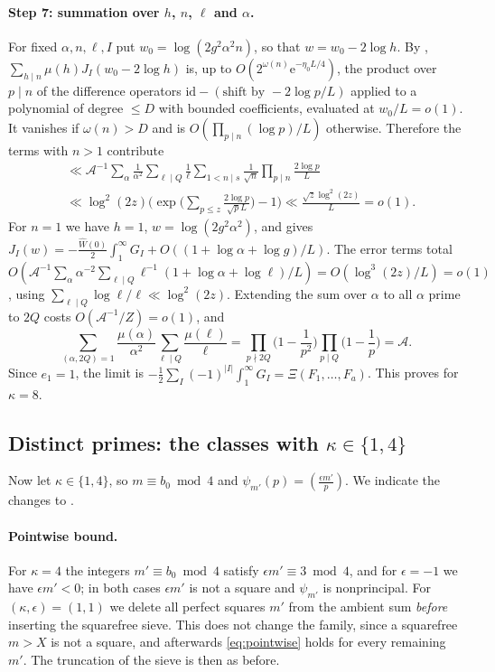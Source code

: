 \documentclass[11pt,colorlinks]{charlie}
\newcommand{\cA}{\mathcal{A}}
\newcommand{\e}{\mathrm{e}}
\begin{document}
\paragraph{Step 7: summation over $h$, $n$, $\ell$ and $\alpha$.}
For fixed $\alpha,n,\ell,I$ put $w_0=\log(2g^2\alpha^2n)$, so that $w=w_0-2\log h$. By , $\sum_{h\mid n}\mu(h)J_I(w_0-2\log h)$ is, up to $O(2^{\omega(n)}\e^{-\eta_0L/4})$, the product over $p\mid n$ of the difference operators $\mathrm{id}-(\text{shift by }-2\log p/L)$ applied to a polynomial of degree $\le D$ with bounded coefficients, evaluated at $w_0/L=o(1)$. It vanishes if $\omega(n)>D$ and is $O(\prod_{p\mid n}(\log p)/L)$ otherwise. Therefore the terms with $n>1$ contribute
\begin{align*}
 &\ll\cA^{-1}\sum_\alpha\frac1{\alpha^2}\sum_{\ell\mid Q}\frac1\ell\sum_{1<n\mid s}\frac1{\sqrt n}\prod_{p\mid n}\frac{2\log p}L\\
 &\ll\log^2(2z)\Big(\exp\Big(\sum_{p\le z}\frac{2\log p}{\sqrt pL}\Big)-1\Big)\ll\frac{\sqrt z\log^2(2z)}L=o(1).
\end{align*}
For $n=1$ we have $h=1$, $w=\log(2g^2\alpha^2)$, and  gives $J_I(w)=-\frac{\widehat W(0)}2\int_1^\infty G_I+O((1+\log\alpha+\log g)/L)$. The error terms total $O(\cA^{-1}\sum_\alpha\alpha^{-2}\sum_{\ell\mid Q}\ell^{-1}(1+\log\alpha+\log\ell)/L)=O(\log^3(2z)/L)=o(1)$, using $\sum_{\ell\mid Q}\log\ell/\ell\ll\log^2(2z)$. Extending the sum over $\alpha$ to all $\alpha$ prime to $2Q$ costs $O(\cA^{-1}/Z)=o(1)$, and
\[
 \sum_{(\alpha,2Q)=1}\frac{\mu(\alpha)}{\alpha^2}\sum_{\ell\mid Q}\frac{\mu(\ell)}\ell=\prod_{p\nmid2Q}\Big(1-\frac1{p^2}\Big)\prod_{p\mid Q}\Big(1-\frac1p\Big)=\cA.
\]
Since $e_1=1$, the limit is $-\frac12\sum_I(-1)^{|I|}\int_1^\infty G_I=\Xi(F_1,\dots,F_a)$. This proves  for $\kappa=8$.

\subsection{Distinct primes: the classes with \texorpdfstring{$\kappa\in\{1,4\}$}{κ = 1, 4}}\label{ssec:odd}
Now let $\kappa\in\{1,4\}$, so $m\equiv b_0\bmod4$ and $\psi_{m'}(p)=(\tfrac{\epsilon m'}p)$. We indicate the changes to .

\paragraph{Pointwise bound.}
For $\kappa=4$ the integers $m'\equiv b_0\bmod 4$ satisfy $\epsilon m'\equiv3\bmod4$, and for $\epsilon=-1$ we have $\epsilon m'<0$; in both cases $\epsilon m'$ is not a square and $\psi_{m'}$ is nonprincipal. For $(\kappa,\epsilon)=(1,1)$ we delete all perfect squares $m'$ from the ambient sum \emph{before} inserting the squarefree sieve. This does not change the family, since a squarefree $m>X$ is not a square, and afterwards \eqref{eq:pointwise} holds for every remaining $m'$. The truncation of the sieve is then as before.
\end{document}
